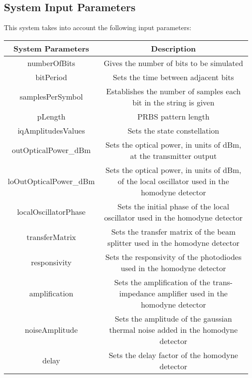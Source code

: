 \subsection*{System Input Parameters}

This system takes into account the following input parameters:

\begin{table}[H]
\centering
\begin{tabulary}{1.0\textwidth}{|C|C|}
\hline
\textbf{System Parameters} & \textbf{Description} 																 \\ \hline
numberOfBits               & Gives the number of bits to be simulated		          										 \\ \hline  
bitPeriod                  & Sets the time between adjacent bits                                                           \\ \hline 
samplesPerSymbol           & Establishes the number of samples each bit in the string is given 	         \\ \hline
pLength                    & PRBS pattern length					                      									 \\ \hline  
iqAmplitudesValues         & Sets the state constellation																	 \\ \hline  
outOpticalPower\_dBm       & Sets the optical power, in units of dBm, at the transmitter output							 \\ \hline  
loOutOpticalPower\_dBm     & Sets the optical power, in units of dBm, of the local oscillator used in the homodyne detector \\ \hline  
localOscillatorPhase       & Sets the initial phase of the local oscillator used in the homodyne detector					 \\ \hline  
transferMatrix             & Sets the transfer matrix of the beam splitter used in the homodyne detector					 \\ \hline  
responsivity               & Sets the responsivity of the photodiodes used in the homodyne detector						 \\ \hline  
amplification              & Sets the amplification of the trans-impedance amplifier used in the homodyne detector			 \\ \hline  
noiseAmplitude             & Sets the amplitude of the gaussian thermal noise added in the homodyne detector				 \\ \hline  
delay                      & Sets the delay factor of the homodyne detector												 \\ \hline  

\end{tabulary}
\end{table}
